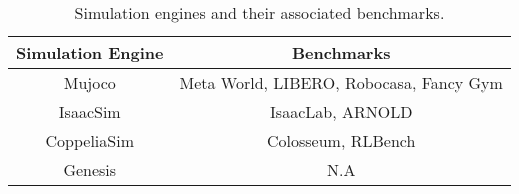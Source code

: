 \begin{table}[t]
    \centering
    \begin{tabular}{cc}
        \hline
        \toprule
        \textbf{Simulation Engine} & \textbf{Benchmarks} \\
        \midrule
        Mujoco & Meta World, LIBERO, Robocasa, Fancy Gym \\
        \midrule
        IsaacSim & IsaacLab, ARNOLD \\
        \midrule
        CoppeliaSim & Colosseum, RLBench \\
        \midrule
        Genesis & N.A \\
        \bottomrule
    \end{tabular}
    \caption{Simulation engines and their associated benchmarks.}
    \label{tab:single-column}
\end{table}
